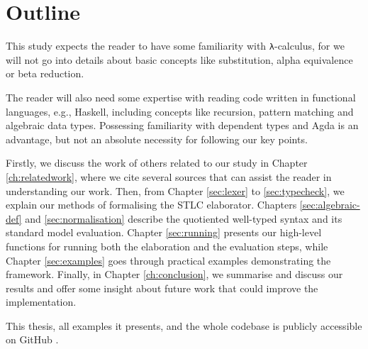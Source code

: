 \chapter{Outline}
\label{ch:outline}

This study expects the reader to have some familiarity with \verb$λ$-calculus, for we will not go into details about basic concepts like substitution, alpha equivalence or beta reduction.

The reader will also need some expertise with reading code written in functional languages, e.g., Haskell, including concepts like recursion, pattern matching and algebraic data types. Possessing familiarity with dependent types and Agda is an advantage, but not an absolute necessity for following our key points.

Firstly, we discuss the work of others related to our study in Chapter \ref{ch:relatedwork}, where we cite several sources that can assist the reader in understanding our work. Then, from Chapter \ref{sec:lexer} to \ref{sec:typecheck}, we explain our methods of formalising the STLC elaborator. Chapters \ref{sec:algebraic-def} and \ref{sec:normalisation} describe the quotiented well-typed syntax and its standard model evaluation. Chapter \ref{sec:running} presents our high-level functions for running both the elaboration and the evaluation steps, while Chapter \ref{sec:examples} goes through practical examples demonstrating the framework. Finally, in Chapter \ref{ch:conclusion}, we summarise and discuss our results and offer some insight about future work that could improve the implementation.

This thesis, all examples it presents, and the whole codebase is publicly accessible on GitHub \cite{home-repo}.

